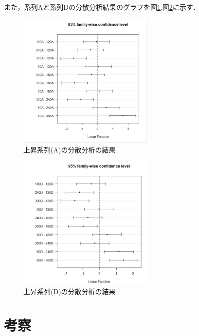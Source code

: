 \documentclass{jlreq}
\numberwithin{equation}{section}
\begin{document}
また，系列Aと系列Dの分散分析結果のグラフを図\ref{fig:result_a},図\ref{fig:result_d}に示す．
\begin{figure}[H]
  \centering
  \includegraphics[width=0.6\textwidth]{image/a_信頼区間.png}
  \caption{上昇系列(A)の分散分析の結果}
  \label{fig:result_a}
\end{figure}

\begin{figure}[H]
  \centering
  \includegraphics[width=0.6\textwidth]{image/d_信頼区間.png}
  \caption{上昇系列(D)の分散分析の結果}
  \label{fig:result_d}
\end{figure}

\section{考察}
\end{document}
